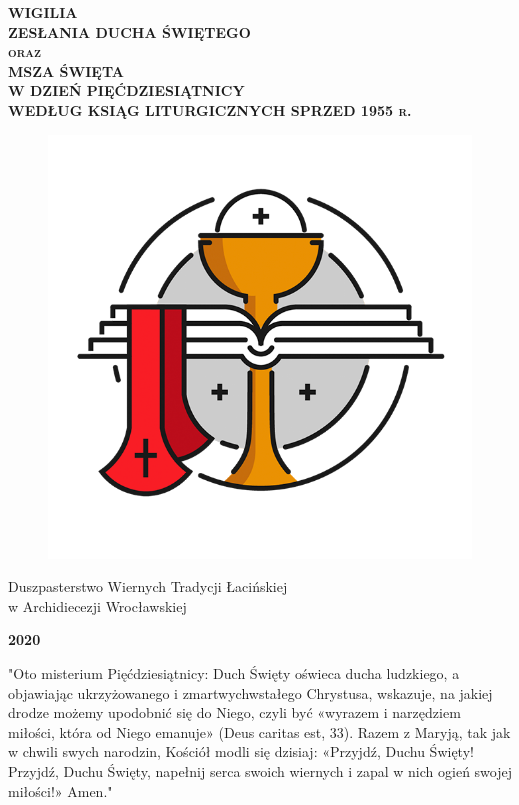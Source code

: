 \documentclass[10pt,a5paper]{book}
\begin{document}
\thispagestyle{empty}

\begin{center}
	\vspace*{0.5cm}


	\bfseries\scshape
	\huge WIGILIA \\ ZESŁANIA DUCHA ŚWIĘTEGO \\\medskip
	\Large oraz \\\medskip
	\huge MSZA ŚWIĘTA \\ W DZIEŃ PIĘĆDZIESIĄTNICY \\\bigskip
	\large WEDŁUG KSIĄG LITURGICZNYCH SPRZED 1955 r.

	\vfill


	\vfill

	\begin{figure}[h]
		\centering
		\includegraphics[width=0.5\linewidth]{logo.png}
	\end{figure}

	\vfill

	{\large Duszpasterstwo Wiernych Tradycji Łacińskiej \\ w Archidiecezji
		Wrocławskiej}

	\bigskip

	{\Large \textbf{2020}}


\end{center}


\newpage
\thispagestyle{empty}

\vspace*{2cm}
"Oto misterium Pięćdziesiątnicy: Duch Święty oświeca ducha ludzkiego, a
objawiając ukrzyżowanego i zmartwychwstałego Chrystusa, wskazuje, na jakiej
drodze możemy upodobnić się do Niego, czyli być «wyrazem i narzędziem miłości,
która od Niego emanuje» (Deus caritas est, 33). Razem z Maryją, tak jak w chwili
swych narodzin, Kościół modli się dzisiaj: «Przyjdź, Duchu Święty! Przyjdź,
Duchu Święty, napełnij serca swoich wiernych i zapal w nich ogień swojej
miłości!» Amen."
\end{document}
